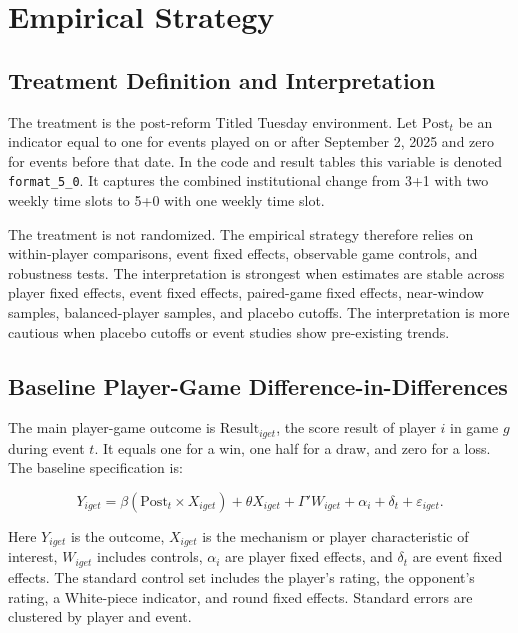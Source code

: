\section{Empirical Strategy}

\subsection{Treatment Definition and Interpretation}

The treatment is the post-reform Titled Tuesday environment. Let \(\text{Post}_t\) be an indicator equal to one for events played on or after September 2, 2025 and zero for events before that date. In the code and result tables this variable is denoted \texttt{format\_5\_0}. It captures the combined institutional change from 3+1 with two weekly time slots to 5+0 with one weekly time slot.

The treatment is not randomized. The empirical strategy therefore relies on within-player comparisons, event fixed effects, observable game controls, and robustness tests. The interpretation is strongest when estimates are stable across player fixed effects, event fixed effects, paired-game fixed effects, near-window samples, balanced-player samples, and placebo cutoffs. The interpretation is more cautious when placebo cutoffs or event studies show pre-existing trends.



\subsection{Baseline Player-Game Difference-in-Differences}

The main player-game outcome is \(\text{Result}_{iget}\), the score result of player \(i\) in game \(g\) during event \(t\). It equals one for a win, one half for a draw, and zero for a loss. The baseline specification is:

\begin{equation}
\label{eq:baseline}
Y_{iget}
= \beta \left(\text{Post}_{t} \times X_{iget}\right)
+ \theta X_{iget}
+ \Gamma' W_{iget}
+ \alpha_i
+ \delta_t
+ \varepsilon_{iget}.
\end{equation}

\noindent Here \(Y_{iget}\) is the outcome, \(X_{iget}\) is the mechanism or player characteristic of interest, \(W_{iget}\) includes controls, \(\alpha_i\) are player fixed effects, and \(\delta_t\) are event fixed effects. The standard control set includes the player's rating, the opponent's rating, a White-piece indicator, and round fixed effects. Standard errors are clustered by player and event.

